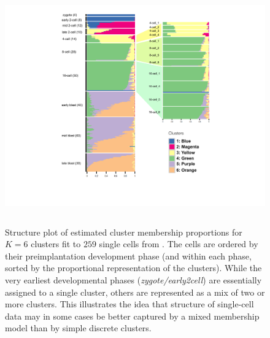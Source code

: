 \begin{figure}[ht]
\centering
\includegraphics[height=4in, width=5.5in]{../plots/deng-figures/deng-main.pdf}
\caption{Structure plot of estimated cluster membership proportions for $K=6$ clusters fit to $259$ single cells from  \cite{Deng2014}. The cells are ordered
by their preimplantation development phase (and within each phase, sorted by the proportional representation of the clusters). While the very earliest developmental phases 
(\textit{zygote/early2cell}) are essentially assigned to a single cluster, others are represented as a mix of two or more clusters. This illustrates the idea that
structure of single-cell data may in some cases be better captured by a mixed membership model than by simple discrete clusters.}
\label{fig:fig4}
\end{figure}




